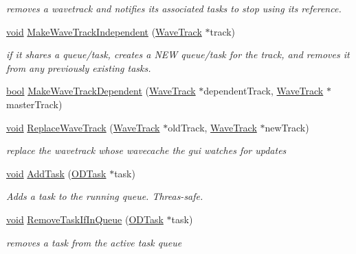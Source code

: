 \begin{DoxyCompactItemize}
\begin{DoxyCompactList}\small\item\em removes a wavetrack and notifies its associated tasks to stop using its reference. \end{DoxyCompactList}\item 
\hyperlink{sound_8c_ae35f5844602719cf66324f4de2a658b3}{void} \hyperlink{class_o_d_manager_ab3dd83fd9c3e4c82f25375e38c7088d5}{Make\+Wave\+Track\+Independent} (\hyperlink{class_wave_track}{Wave\+Track} $\ast$track)
\begin{DoxyCompactList}\small\item\em if it shares a queue/task, creates a N\+EW queue/task for the track, and removes it from any previously existing tasks. \end{DoxyCompactList}\item 
\hyperlink{mac_2config_2i386_2lib-src_2libsoxr_2soxr-config_8h_abb452686968e48b67397da5f97445f5b}{bool} \hyperlink{class_o_d_manager_a97998606b0ea08aa946d7b407ffd015e}{Make\+Wave\+Track\+Dependent} (\hyperlink{class_wave_track}{Wave\+Track} $\ast$dependent\+Track, \hyperlink{class_wave_track}{Wave\+Track} $\ast$master\+Track)
\item 
\hyperlink{sound_8c_ae35f5844602719cf66324f4de2a658b3}{void} \hyperlink{class_o_d_manager_a203a4219308dd19912edb5aa6084cf55}{Replace\+Wave\+Track} (\hyperlink{class_wave_track}{Wave\+Track} $\ast$old\+Track, \hyperlink{class_wave_track}{Wave\+Track} $\ast$new\+Track)
\begin{DoxyCompactList}\small\item\em replace the wavetrack whose wavecache the gui watches for updates \end{DoxyCompactList}\item 
\hyperlink{sound_8c_ae35f5844602719cf66324f4de2a658b3}{void} \hyperlink{class_o_d_manager_a83ff55a20825529c681bede89cd1da8e}{Add\+Task} (\hyperlink{class_o_d_task}{O\+D\+Task} $\ast$task)
\begin{DoxyCompactList}\small\item\em Adds a task to the running queue. Threas-\/safe. \end{DoxyCompactList}\item 
\hyperlink{sound_8c_ae35f5844602719cf66324f4de2a658b3}{void} \hyperlink{class_o_d_manager_af8842cb56eaca1e61383e9e6f6d86aaa}{Remove\+Task\+If\+In\+Queue} (\hyperlink{class_o_d_task}{O\+D\+Task} $\ast$task)
\begin{DoxyCompactList}\small\item\em removes a task from the active task queue \end{DoxyCompactList}\item 

\end{DoxyCompactItemize}
